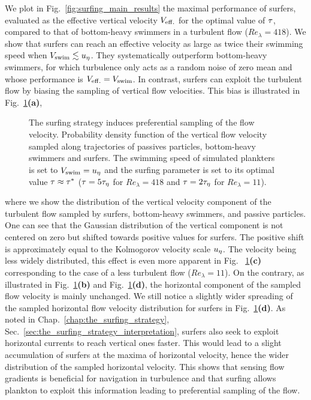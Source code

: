 We plot in Fig.~\ref{fig:surfing_main_results} the maximal performance of surfers, evaluated as the effective vertical velocity $V_{\mathrm{eff.}}$ for the optimal value of $\tau$, compared to that of bottom-heavy swimmers in a turbulent flow ($\mathit{Re}_{\lambda} = 418$).
We show that surfers can reach an effective velocity as large as twice their swimming speed when $V_{\mathrm{swim}} \lesssim u_{\eta}$.
They systematically outperform bottom-heavy swimmers, for which turbulence only acts as a random noise of zero mean and whose performance is $V_{\mathrm{eff.}} = V_{\mathrm{swim}}$.
In contrast, surfers can exploit the turbulent flow by biasing the sampling of vertical flow velocities. 
This bias is illustrated in Fig.~\ref{fig:surfing_velocity_sampled}\textbf{(a)}, 
\begin{figure}[t]
	\centering
	
	\caption[The surfing strategy induces preferential sampling of the flow velocity.]{
		The surfing strategy induces preferential sampling of the flow velocity.
		Probability density function of the vertical flow velocity sampled along trajectories of passives particles, bottom-heavy swimmers and surfers. 
		The swimming speed of simulated plankters is set to $V_{\mathrm{swim}} = u_{\eta}$ and the surfing parameter is set to its optimal value $\tau \approx \tau^*$ ($\tau = 5 \tau_{\eta}$ for $\mathit{Re}_{\lambda} = 418$ and $\tau = 2 \tau_{\eta}$ for $\mathit{Re}_{\lambda} = 11$).
	}
	\label{fig:surfing_velocity_sampled}
\end{figure}
where we show the distribution of the vertical velocity component of the turbulent flow sampled by surfers, bottom-heavy swimmers, and passive particles.
One can see that the Gaussian distribution of the vertical component is not centered on zero but shifted towards positive values for surfers.
The positive shift is approximately equal to the Kolmogorov velocity scale $u_{\eta}$.
The velocity being less widely distributed, this effect is even more apparent in Fig. ~\ref{fig:surfing_velocity_sampled}\textbf{(c)} corresponding to the case of a less turbulent flow ($\mathit{Re}_{\lambda} = 11$).
On the contrary, as illustrated in Fig.~\ref{fig:surfing_velocity_sampled}\textbf{(b)} and Fig.~\ref{fig:surfing_velocity_sampled}\textbf{(d)}, the horizontal component of the sampled flow velocity is mainly unchanged.
We still notice a slightly wider spreading of the sampled horizontal flow velocity distribution for surfers in Fig.~\ref{fig:surfing_velocity_sampled}\textbf{(d)}.
As noted in Chap.~\ref{chap:the_surfing_strategy}, Sec.~\ref{sec:the_surfing_strategy_interpretation}, surfers also seek to exploit horizontal currents to reach vertical ones faster.
This would lead to a slight accumulation of surfers at the maxima of horizontal velocity, hence the wider distribution of the sampled horizontal velocity.
This shows that sensing flow gradients is beneficial for navigation in turbulence and that surfing allows plankton to exploit this information leading to preferential sampling of the flow.

